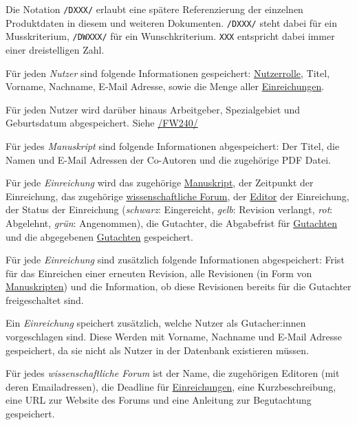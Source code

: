
Die Notation \texttt{/DXXX/} erlaubt eine spätere Referenzierung der einzelnen Produktdaten in diesem und weiteren
Dokumenten. \texttt{/DXXX/} steht dabei für ein Musskriterium, \texttt{/DWXXX/} für ein Wunschkriterium. \texttt{XXX} entspricht dabei immer einer dreistelligen Zahl.

\begin{description}
	 Für jeden \emph{Nutzer} sind folgende Informationen gespeichert: \hyperref[funkt:nutzer]{Nutzerrolle}, Titel, Vorname, Nachname, E-Mail Adresse, sowie die Menge aller \hyperref[d025]{Einreichungen}.

	 Für jeden Nutzer wird darüber hinaus Arbeitgeber, Spezialgebiet und Geburtsdatum abgespeichert. Siehe \hyperref[funkt:240]{/FW240/}

	 Für jedes \emph{Manuskript} sind folgende Informationen abgespeichert: Der Titel, die Namen und E-Mail Adressen der Co-Autoren und die zugehörige PDF Datei.

	 Für jede \emph{Einreichung} wird das zugehörige \hyperref[d020]{Manuskript}, der Zeitpunkt der Einreichung, das zugehörige \hyperref[d030]{wissenschaftliche Forum}, der \hyperref[funkt:editor]{Editor} der Einreichung, der Status der Einreichung (\emph{schwarz}: Eingereicht, \emph{gelb}: Revision verlangt, \emph{rot}: Abgelehnt, \emph{grün}: Angenommen), die Gutachter, die Abgabefrist für \hyperref[d040]{Gutachten} und die abgegebenen \hyperref[d040]{Gutachten} gespeichert.

	 Für jede \emph{Einreichung} sind zusätzlich folgende Informationen abgespeichert: Frist für das Einreichen einer erneuten Revision, alle Revisionen (in Form von \hyperref[d020]{Manuskripten}) und die Information, ob diese Revisionen bereits für die Gutachter freigeschaltet sind.

	 Ein \emph{Einreichung} speichert zusätzlich, welche Nutzer als Gutacher:innen vorgeschlagen sind. Diese Werden mit Vorname, Nachname und E-Mail Adresse gespeichert, da sie nicht als Nutzer in der Datenbank existieren müssen.

	 Für jedes \emph{wissenschaftliche Forum} ist der Name, die zugehörigen Editoren (mit deren Emailadressen), die Deadline für \hyperref[d025]{Einreichungen}, eine Kurzbeschreibung, eine URL zur Website des Forums und eine Anleitung zur Begutachtung gespeichert.


\end{description}
